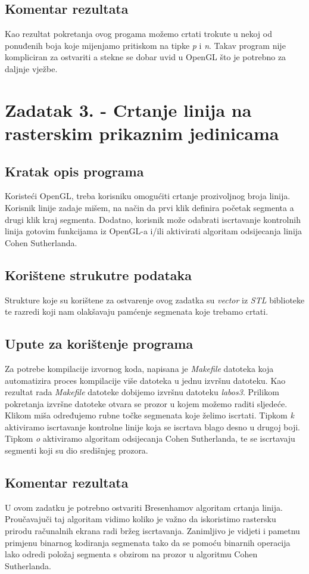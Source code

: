 \documentclass[oneside]{scrbook}
\begin{document}
\subsection{Komentar rezultata}
Kao rezultat pokretanja ovog progama možemo crtati trokute u nekoj od ponuđenih boja koje mijenjamo pritiskom na tipke \textit{p} i \textit{n}. Takav program nije kompliciran za ostvariti a stekne se dobar uvid u OpenGL što je potrebno za daljnje vježbe.

\section{Zadatak 3. - Crtanje linija na rasterskim prikaznim jedinicama}
\subsection{Kratak opis programa}
Koristeći OpenGL, treba korisniku omogućiti crtanje prozivoljnog broja linija. Korisnik linije zadaje mišem, na način da prvi klik definira početak segmenta a drugi klik kraj segmenta. Dodatno, korisnik može odabrati iscrtavanje kontrolnih linija gotovim funkcijama iz OpenGL-a i/ili aktivirati algoritam odsijecanja linija Cohen Sutherlanda.

\subsection{Korištene strukutre podataka}
Strukture koje su korištene za ostvarenje ovog zadatka su \textit{vector} iz \textit{STL} biblioteke te razredi koji nam olakšavaju pamćenje segmenata koje trebamo crtati.

\subsection{Upute za korištenje programa}
Za potrebe kompilacije izvornog koda, napisana je \textit{Makefile} datoteka koja automatizira proces kompilacije više datoteka u jednu izvršnu datoteku. Kao rezultat rada \textit{Makefile} datoteke dobijemo izvršnu datoteku \textit{labos3}. Prilikom pokretanja izvršne datoteke otvara se prozor u kojem možemo raditi sljedeće. Klikom miša određujemo rubne točke segmenata koje želimo iscrtati. Tipkom \textit{k} aktiviramo iscrtavanje kontrolne linije koja se iscrtava blago desno u drugoj boji. Tipkom \textit{o} aktiviramo algoritam odsijecanja Cohen Sutherlanda, te se iscrtavaju segmenti koji su dio središnjeg prozora.

\subsection{Komentar rezultata}
U ovom zadatku je potrebno ostvariti Bresenhamov algoritam crtanja linija. Proučavajuči taj algoritam vidimo koliko je važno da iskoristimo rastersku prirodu računalnih ekrana radi bržeg iscrtavanja. Zanimljivo je vidjeti i pametnu primjenu binarnog kodiranja segmenata tako da se pomoću binarnih operacija lako odredi položaj segmenta s obzirom na prozor u algoritmu Cohen Sutherlanda. 
\end{document}
